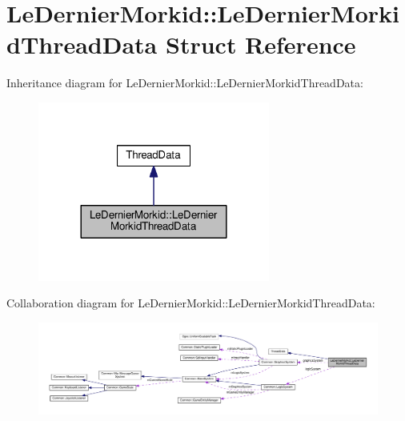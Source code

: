 \hypertarget{struct_le_dernier_morkid_1_1_le_dernier_morkid_thread_data}{}\section{Le\+Dernier\+Morkid\+:\+:Le\+Dernier\+Morkid\+Thread\+Data Struct Reference}
\label{struct_le_dernier_morkid_1_1_le_dernier_morkid_thread_data}


Inheritance diagram for Le\+Dernier\+Morkid\+:\+:Le\+Dernier\+Morkid\+Thread\+Data\+:\nopagebreak
\begin{figure}[H]
\begin{center}
\leavevmode
\includegraphics[width=216pt]{struct_le_dernier_morkid_1_1_le_dernier_morkid_thread_data__inherit__graph}
\end{center}
\end{figure}


Collaboration diagram for Le\+Dernier\+Morkid\+:\+:Le\+Dernier\+Morkid\+Thread\+Data\+:\nopagebreak
\begin{figure}[H]
\begin{center}
\leavevmode
\includegraphics[width=350pt]{struct_le_dernier_morkid_1_1_le_dernier_morkid_thread_data__coll__graph}
\end{center}
\end{figure}
